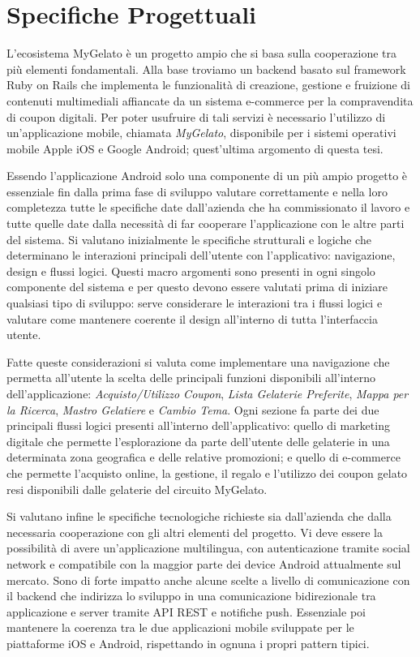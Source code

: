 
\chapter{Specifiche Progettuali}

L'ecosistema MyGelato è un progetto ampio che si basa sulla cooperazione
tra più elementi fondamentali. Alla base troviamo un backend basato
sul framework Ruby on Rails che implementa le funzionalità di creazione,
gestione e fruizione di contenuti multimediali affiancate da un sistema
e-commerce per la compravendita di coupon digitali. Per poter usufruire
di tali servizi è necessario l'utilizzo di un'applicazione mobile,
chiamata \emph{MyGelato}, disponibile per i sistemi operativi mobile
Apple iOS e Google Android; quest'ultima argomento di questa tesi.\bigskip{}

Essendo l'applicazione Android solo una componente di un più ampio
progetto è essenziale fin dalla prima fase di sviluppo valutare correttamente
e nella loro completezza tutte le specifiche date dall'azienda che
ha commissionato il lavoro e tutte quelle date dalla necessità di
far cooperare l'applicazione con le altre parti del sistema. Si valutano
inizialmente le specifiche strutturali e logiche che determinano le
interazioni principali dell'utente con l'applicativo: navigazione,
design e flussi logici. Questi macro argomenti sono presenti in ogni
singolo componente del sistema e per questo devono essere valutati
prima di iniziare qualsiasi tipo di sviluppo: serve considerare le
interazioni tra i flussi logici e valutare come mantenere coerente
il design all'interno di tutta l'interfaccia utente.\bigskip{}

Fatte queste considerazioni si valuta come implementare una navigazione
che permetta all'utente la scelta delle principali funzioni disponibili
all'interno dell'applicazione: \textit{Acquisto/Utilizzo Coupon},
\textit{Lista Gelaterie Preferite}, \textit{Mappa per la Ricerca},
\textit{Mastro Gelatiere} e \textit{Cambio Tema}. Ogni sezione fa
parte dei due principali flussi logici presenti all'interno dell'applicativo:
quello di marketing digitale che permette l'esplorazione da parte
dell'utente delle gelaterie in una determinata zona geografica e delle
relative promozioni; e quello di e-commerce che permette l'acquisto
online, la gestione, il regalo e l'utilizzo dei coupon gelato resi
disponibili dalle gelaterie del circuito MyGelato.\bigskip{}

Si valutano infine le specifiche tecnologiche richieste sia dall'azienda
che dalla necessaria cooperazione con gli altri elementi del progetto.
Vi deve essere la possibilità di avere un'applicazione multilingua,
con autenticazione tramite social network e compatibile con la maggior
parte dei device Android attualmente sul mercato. Sono di forte impatto
anche alcune scelte a livello di comunicazione con il backend che
indirizza lo sviluppo in una comunicazione bidirezionale tra applicazione
e server tramite API REST e notifiche push. Essenziale poi mantenere
la coerenza tra le due applicazioni mobile sviluppate per le piattaforme
iOS e Android, rispettando in ognuna i propri pattern tipici.

